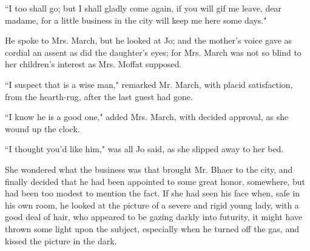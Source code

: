 ``I too shall go; but I shall gladly come again, if you will gif me
leave, dear madame, for a little business in the city will keep me here
some days."

He spoke to Mrs. March, but he looked at Jo; and the
mother's voice gave as cordial an assent as did the
daughter's eyes; for Mrs. March was not so blind to her
children's interest as Mrs. Moffat supposed.

``I suspect that is a wise man," remarked Mr. March, with placid
satisfaction, from the hearth-rug, after the last guest had gone.

``I know he is a good one," added Mrs. March, with decided approval, as
she wound up the clock.

``I thought you'd like him," was all Jo said, as she
slipped away to her bed.

She wondered what the business was that brought Mr. Bhaer to the city,
and finally decided that he had been appointed to some great honor,
somewhere, but had been too modest to mention the fact. If she had seen
his face when, safe in his own room, he looked at the picture of a
severe and rigid young lady, with a good deal of hair, who appeared to
be gazing darkly into futurity, it might have thrown some light upon the
subject, especially when he turned off the gas, and kissed the picture
in the dark.
